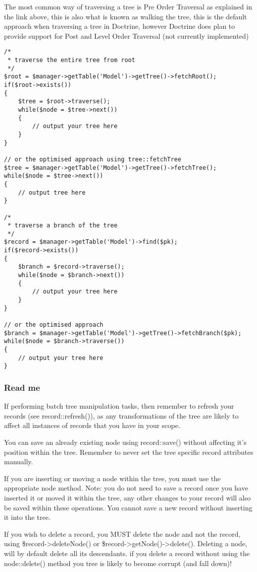 \documentclass[11pt,a4paper]{report}
\begin{document}
The most common way of traversing a tree is Pre Order Traversal as explained in the link above, this is also what is known as walking the tree, this is the default approach when traversing a tree in Doctrine, however Doctrine does plan to provide support for Post and Level Order Traversal (not currently implemented)

\begin{verbatim}
/*
 * traverse the entire tree from root
 */
$root = $manager->getTable('Model')->getTree()->fetchRoot();
if($root->exists())
{
    $tree = $root->traverse();
    while($node = $tree->next())
    {
        // output your tree here
    }
}

// or the optimised approach using tree::fetchTree
$tree = $manager->getTable('Model')->getTree()->fetchTree();
while($node = $tree->next())
{
    // output tree here
}

/*
 * traverse a branch of the tree
 */
$record = $manager->getTable('Model')->find($pk);
if($record->exists())
{
    $branch = $record->traverse();
    while($node = $branch->next())
    {
        // output your tree here
    }
}

// or the optimised approach
$branch = $manager->getTable('Model')->getTree()->fetchBranch($pk);
while($node = $branch->traverse())
{
    // output your tree here
}
\end{verbatim}

\subsubsection{Read me}
If performing batch tree manipulation tasks, then remember to refresh your records (see record::refresh()), as any transformations of the tree are likely to affect all instances of records that you have in your scope.

You can save an already existing node using record::save() without affecting it's position within the tree. Remember to never set the tree specific record attributes manually.

If you are inserting or moving a node within the tree, you must use the appropriate node method. Note: you do not need to save a record once you have inserted it or moved it within the tree, any other changes to your record will also be saved within these operations. You cannot save a new record without inserting it into the tree.

If you wish to delete a record, you MUST delete the node and not the record, using \$record->deleteNode() or \$record->getNode()->delete(). Deleting a node, will by default delete all its descendants. if you delete a record without using the node::delete() method you tree is likely to become corrupt (and fall down)!
\end{document}
